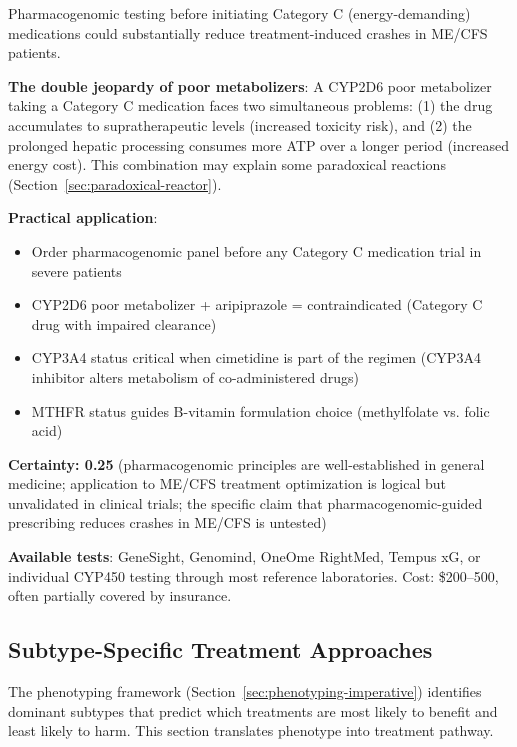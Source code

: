 \begin{speculation}
\label{spec:pharmacogenomics-harm-reduction}

Pharmacogenomic testing before initiating Category C (energy-demanding) medications could substantially reduce treatment-induced crashes in ME/CFS patients.

\textbf{The double jeopardy of poor metabolizers}: A CYP2D6 poor metabolizer taking a Category C medication faces two simultaneous problems: (1) the drug accumulates to supratherapeutic levels (increased toxicity risk), and (2) the prolonged hepatic processing consumes more ATP over a longer period (increased energy cost). This combination may explain some paradoxical reactions (Section~\ref{sec:paradoxical-reactor}).

\textbf{Practical application}:
\begin{itemize}
    \item Order pharmacogenomic panel before any Category C medication trial in severe patients
    \item CYP2D6 poor metabolizer + aripiprazole = contraindicated (Category C drug with impaired clearance)
    \item CYP3A4 status critical when cimetidine is part of the regimen (CYP3A4 inhibitor alters metabolism of co-administered drugs)
    \item MTHFR status guides B-vitamin formulation choice (methylfolate vs. folic acid)
\end{itemize}

\textbf{Certainty: 0.25} (pharmacogenomic principles are well-established in general medicine; application to ME/CFS treatment optimization is logical but unvalidated in clinical trials; the specific claim that pharmacogenomic-guided prescribing reduces crashes in ME/CFS is untested)

\textbf{Available tests}: GeneSight, Genomind, OneOme RightMed, Tempus xG, or individual CYP450 testing through most reference laboratories. Cost: \$200--500, often partially covered by insurance.
\end{speculation}

\subsection{Subtype-Specific Treatment Approaches}
\label{sec:subtype-approaches}

The phenotyping framework (Section~\ref{sec:phenotyping-imperative}) identifies dominant subtypes that predict which treatments are most likely to benefit and least likely to harm. This section translates phenotype into treatment pathway.


